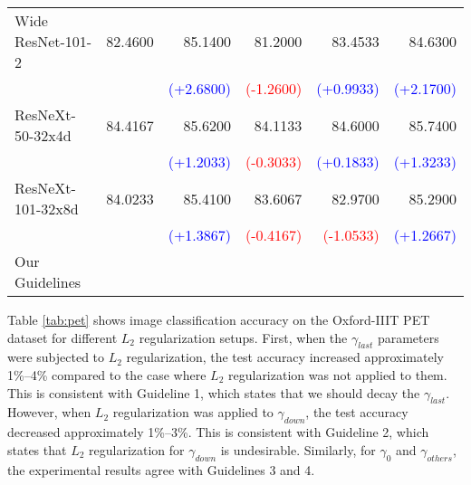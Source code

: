 \documentclass{article}
\newcommand{\cmark}{\ding{51}}\newcommand{\xmark}{\ding{55}}
\begin{document}
\begin{table}[h!]
\begin{tabular}{l|r|r|r|r|r}
		\midrule
		Wide ResNet-101-2                   & 82.4600   & 85.1400                     & 81.2000                    & 83.4533                     & 84.6300                     \\
		                                    &           & \textcolor{blue}{(+2.6800)} & \textcolor{red}{(-1.2600)} & \textcolor{blue}{(+0.9933)} & \textcolor{blue}{(+2.1700)} \\
		\midrule
		ResNeXt-50-32x4d                    & 84.4167   & 85.6200                     & 84.1133                    & 84.6000                     & 85.7400                     \\
		                                    &           & \textcolor{blue}{(+1.2033)} & \textcolor{red}{(-0.3033)} & \textcolor{blue}{(+0.1833)} & \textcolor{blue}{(+1.3233)} \\
		\midrule
		ResNeXt-101-32x8d                   & 84.0233   & 85.4100                     & 83.6067                    & 82.9700                     & 85.2900                     \\
		                                    &           & \textcolor{blue}{(+1.3867)} & \textcolor{red}{(-0.4167)} & \textcolor{red}{(-1.0533)}  & \textcolor{blue}{(+1.2667)} \\
        \midrule
		\midrule
        Our Guidelines                      & \textcolor{blue}{\cmark} & \textcolor{blue}{\cmark}    & \textcolor{red}{\xmark}    & \textcolor{red}{\xmark}     & \textcolor{blue}{\cmark}    \\
		\bottomrule
	\end{tabular}
\end{table}

Table \ref{tab:pet} shows image classification accuracy on the Oxford-IIIT PET dataset \cite{gcvpr/ParkhiVZJ12} for different $L_2$ regularization setups. First, when the $\gamma_{last}$ parameters were subjected to $L_2$ regularization, the test accuracy increased approximately 1\%--4\% compared to the case where $L_2$ regularization was not applied to them. This is consistent with Guideline 1, which states that we should decay the $\gamma_{last}$. However, when $L_2$ regularization was applied to $\gamma_{down}$, the test accuracy decreased approximately 1\%--3\%. This is consistent with Guideline 2, which states that $L_2$ regularization for $\gamma_{down}$ is undesirable. Similarly, for $\gamma_0$ and $\gamma_{others}$, the experimental results agree with Guidelines 3 and 4.
\end{document}
